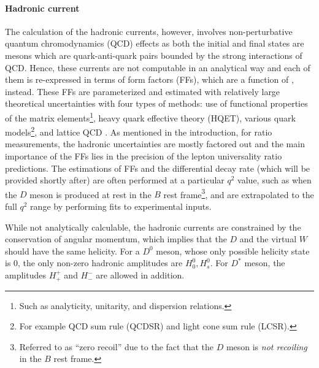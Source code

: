 \paragraph{Hadronic current} The calculation of the hadronic currents, however,
involves non-perturbative quantum chromodynamics (QCD) effects as both the
initial and final states are mesons which are quark-anti-quark pairs bounded by
the strong interactions of QCD.
Hence, these currents are not computable in an analytical way and each of them
is re-expressed in terms of form factors (FFs),
which are a function of \qSq, instead.
These FFs are parameterized and estimated with relatively large theoretical
uncertainties with four types of methods:
use of functional properties of the matrix elements\footnote{
    Such as analyticity, unitarity, and dispersion relations.
},
heavy quark effective theory (HQET),
various quark models\footnote{
    For example QCD sum rule (QCDSR) and light cone sum rule (LCSR).
},
and lattice QCD
\cite{Bernlochner_2022}.
As mentioned in the introduction,
for \RDX ratio measurements,
the hadronic uncertainties are mostly factored out and the main importance
of the FFs lies in the precision of the lepton universality ratio predictions.
The estimations of FFs
and the differential decay rate (which will be provided shortly after)
are often performed at a particular $q^2$ value, such as when the $D$ meson is
produced at rest in the $B$ rest frame\footnote{
    Referred to as ``zero recoil'' due to the fact that the $D$ meson is
    \emph{not recoiling} in the $B$ rest frame.
},
and are extrapolated to the full $q^2$ range by performing fits to experimental
inputs.

While not analytically calculable,
the hadronic currents are constrained by the conservation of angular momentum,
which implies that the $D$ and the virtual $W$ should have the same helicity.
For a $D^0$ meson, whose only possible helicity state is 0,
the only non-zero hadronic amplitudes are $H^0_0, H^0_s$.
For $D^*$ meson,
the amplitudes $H^+_+$ and $H^-_-$ are allowed in addition.

